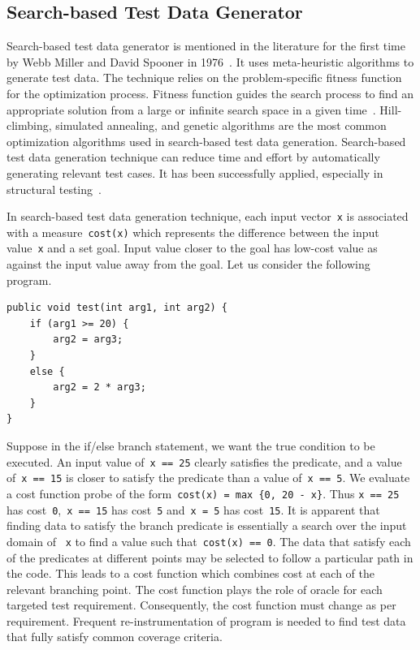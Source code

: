 
\subsection{Search-based Test Data Generator} \label{sec:search_based_2}
Search-based test data generator is mentioned in the literature for the first time by Webb Miller and David Spooner in 1976~\cite{miller1976automatic}. It uses meta-heuristic algorithms to generate test data. The technique relies on the problem-specific fitness function for the optimization process. Fitness function guides the search process to find an appropriate solution from a large or infinite search space in a given time~\cite{mcminn2011search}. Hill-climbing, simulated annealing, and genetic algorithms are the most common optimization algorithms used in search-based test data generation. Search-based test data generation technique can reduce time and effort by automatically generating relevant test cases. It has been successfully applied, especially in structural testing~\cite{mcminn2011search, jones1996automatic}.

In search-based test data generation technique, each input vector~\verb+x+ is associated with a measure~\verb+cost(x)+ which represents the difference between the input value~\verb+x+ and a set goal. Input value closer to the goal has low-cost value as against the input value away from the goal. 
Let us consider the following program.

\bigskip
\begin{lstlisting}
public void test(int arg1, int arg2) {
	if (arg1 >= 20) {
		arg2 = arg3; 
	}
	else {
		arg2 = 2 * arg3;
	}
}
\end{lstlisting}
\bigskip

Suppose in the if/else branch statement, we want the true condition to be executed. An input value of~\verb+x == 25+ clearly satisfies the predicate, and a value of~\verb+x == 15+ is closer to satisfy the predicate than a value of~\verb+x == 5+. We evaluate a cost function probe of the form~\verb+cost(x) = max {0, 20 - x}+. Thus \verb+x == 25+ has cost~\verb+0+,~\verb+x == 15+ has cost~\verb+5+ and~\verb+x = 5+ has cost~\verb+15+. It is apparent that finding data to satisfy the branch predicate is essentially a search over the input domain of ~\verb+x+ to find a value such that~\verb+cost(x) == 0+. The data that satisfy each of the predicates at different points may be selected to follow a particular path in the code. This leads to a cost function which combines cost at each of the relevant branching point. The cost function plays the role of oracle for each targeted test requirement. Consequently, the cost function must change as per requirement. Frequent re-instrumentation of program is needed to find test data that fully satisfy common coverage criteria. 



